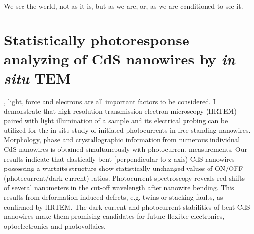 
\begin{savequote}[75mm] 
We see the world, not as it is, but as we are, or, as we are conditioned to see it.
\end{savequote}

\chapter{Statistically photoresponse analyzing of CdS nanowires by \emph{in situ} TEM}

, light, force and electrons are all important factors to be considered. I demonstrate that high resolution transmission electron microscopy (HRTEM) paired with light illumination of a sample and its electrical probing can be utilized for the in situ study of initiated photocurrents in free-standing nanowires. Morphology, phase and crystallographic information from numerous individual CdS nanowires is obtained simultaneously with photocurrent measurements. Our results indicate that elastically bent (perpendicular to z-axis) CdS nanowires possessing a wurtzite structure show statistically unchanged values of ON/OFF (photocurrent/dark current) ratios. Photocurrent spectroscopy reveals red shifts of several nanometers in the cut-off wavelength after nanowire bending. This results from deformation-induced defects, e.g. twins or stacking faults, as confirmed by HRTEM. The dark current and photocurrent stabilities of bent CdS nanowires make them promising candidates for future flexible electronics, optoelectronics and photovoltaics.\\

